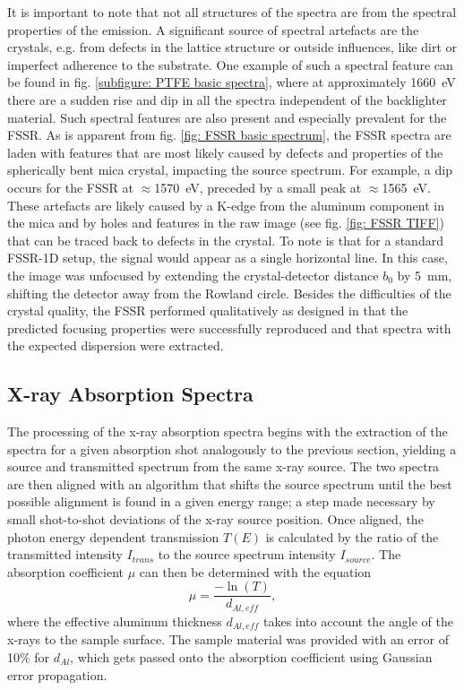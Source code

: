 It is important to note that not all structures of the spectra are from the spectral properties of the emission. A significant source of spectral artefacts are the crystals, e.g. from defects in the lattice structure or outside influences, like dirt or imperfect adherence to the substrate. One example of such a spectral feature can be found in fig. \ref{subfigure: PTFE basic spectra}, where at approximately \SI{1660}{\electronvolt} there are a sudden rise and dip in all the spectra independent of the backlighter material. Such spectral features are also present and especially prevalent for the FSSR. As is apparent from fig. \ref{fig: FSSR basic spectrum}, the FSSR spectra are laden with features that are most likely caused by defects and properties of the spherically bent mica crystal, impacting the source spectrum. For example, a dip occurs for the FSSR at $\approx$\SI{1570}{\electronvolt}, preceded by a small peak at $\approx$\SI{1565}{\electronvolt}. These artefacts are likely caused by a K-edge from the aluminum component in the mica and by holes and features in the raw image (see fig. \ref{fig: FSSR TIFF}) that can be traced back to defects in the crystal. To note is that for a standard FSSR-1D setup, the signal would appear as a single horizontal line. In this case, the image was unfocused by extending the crystal-detector distance $b_0$ by \SI{5}{\milli\meter}, shifting the detector away from the Rowland circle.  Besides the difficulties of the crystal quality, the FSSR performed qualitatively as designed in that the predicted focusing properties were successfully reproduced and that spectra with the expected dispersion were extracted.

\subsection{X-ray Absorption Spectra}
\label{subsection: ab spectra}

The processing of the x-ray absorption spectra begins with the extraction of the spectra for a given absorption shot analogously to the previous section, yielding a source and transmitted spectrum from the same x-ray source. The two spectra are then aligned with an algorithm that shifts the source spectrum until the best possible alignment is found in a given energy range; a step made necessary by small shot-to-shot deviations of the x-ray source position. Once aligned, the photon energy dependent transmission $T(E)$ is calculated by the ratio of the transmitted intensity $I_{trans}$ to the source spectrum intensity $I_{source}$. The absorption coefficient $\mu$ can then be determined with the equation 
\begin{equation}
	\mu = \frac{-\ln(T)}{d_{Al,eff}},
\end{equation}
where the effective aluminum thickness $d_{Al,eff}$ takes into account the angle of the x-rays to the sample surface. The sample material was provided with an error of 10\% for $d_{Al}$, which gets passed onto the absorption coefficient using Gaussian error propagation.

